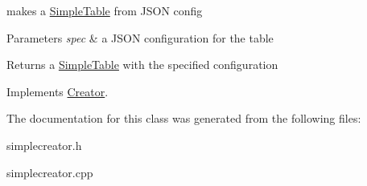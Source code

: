 makes a \mbox{\hyperlink{class_simple_table}{Simple\+Table}} from J\+S\+ON config 


\begin{DoxyParams}{Parameters}
{\em spec} & a J\+S\+ON configuration for the table\\
\hline
\end{DoxyParams}
\begin{DoxyReturn}{Returns}
a \mbox{\hyperlink{class_simple_table}{Simple\+Table}} with the specified configuration 
\end{DoxyReturn}


Implements \mbox{\hyperlink{class_creator_a70c571c0b776a5f29494f660957e0710}{Creator}}.



The documentation for this class was generated from the following files\+:\begin{DoxyCompactItemize}
\item 
simplecreator.\+h\item 
simplecreator.\+cpp\end{DoxyCompactItemize}
